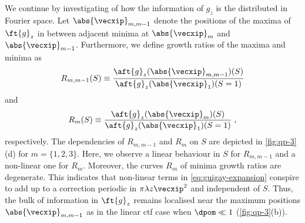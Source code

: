 \documentclass[
twoside,
openright,
titlepage,
numbers=noenddot,
headinclude,
fleqn,
a4paper,
footinclude=true,
cleardoublepage=empty,
abstractoff,
BCOR=5mm,
paper=a4,
fontsize=11pt,
british,ngerman,american,
]{scrreprt}
\begin{document}
We continue by investigating of how the information of $g_z$ is the
distributed in Fourier space.  Let $\abs{\vecxip}_{m,m-1}$ denote the
positions of the maxima of $\ft{g}_z$ in between adjacent minima at
$\abs{\vecxip}_{m}$ and $\abs{\vecxip}_{m-1}$.  Furthermore, we define
growth ratios of the maxima and minima as
\begin{equation}
  \label{eq:maxima-growth}
  R_{m,m-1}(S) \equiv 
  \frac{\aft{g}_z(\abs{\vecxip}_{m,m-1})(S)}
  {\aft{g}_z(\abs{\vecxip}_{1})(S=1)}
\end{equation}
and
\begin{equation}
  \label{eq:minima-growth}
  R_{m}(S) \equiv 
  \frac{\aft{g}_z(\abs{\vecxip}_{m})(S)}
  {\aft{g}_z(\abs{\vecxip}_{1})(S=1)} \;,
\end{equation}
respectively.  The dependencies of $R_{m,m-1}$ and $R_{m}$ on $S$ are
depicted in \cref{fig:qp-3}(d) for $m=\{1,2,3\}$.  Here, we observe a
linear behaviour in $S$ for $R_{m,m-1}$ and a non-linear one for
$R_{m}$.  Moreover, the curves $R_{m}$ of minima growth ratios are
degenerate.  This indicates that non-linear terms in
\cref{eq:guigay-expansion} conspire to add up to a correction periodic
in $\pi\lambda z\vecxip^2$ and independent of $S$.  Thus, the bulk of
information in $\ft{g}_z$ remains localised near the maximum positions
$\abs{\vecxip}_{m,m-1}$ as in the linear \ac{ctf} case when $\dpom\ll
1$ (\cref{fig:qp-3}(b)).
\end{document}
